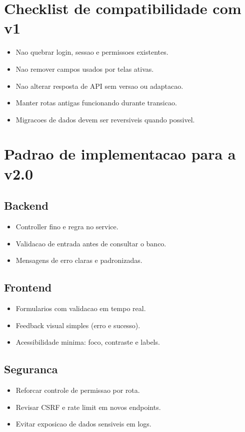 \documentclass[12pt,a4paper]{article}
\begin{document}
\section{Checklist de compatibilidade com v1}
\begin{itemize}[leftmargin=*]
\item Nao quebrar login, sessao e permissoes existentes.
\item Nao remover campos usados por telas ativas.
\item Nao alterar resposta de API sem versao ou adaptacao.
\item Manter rotas antigas funcionando durante transicao.
\item Migracoes de dados devem ser reversiveis quando possivel.
\end{itemize}

\section{Padrao de implementacao para a v2.0}
\subsection{Backend}
\begin{itemize}[leftmargin=*]
\item Controller fino e regra no service.
\item Validacao de entrada antes de consultar o banco.
\item Mensagens de erro claras e padronizadas.
\end{itemize}

\subsection{Frontend}
\begin{itemize}[leftmargin=*]
\item Formularios com validacao em tempo real.
\item Feedback visual simples (erro e sucesso).
\item Acessibilidade minima: foco, contraste e labels.
\end{itemize}

\subsection{Seguranca}
\begin{itemize}[leftmargin=*]
\item Reforcar controle de permissao por rota.
\item Revisar CSRF e rate limit em novos endpoints.
\item Evitar exposicao de dados sensiveis em logs.
\end{itemize}
\end{document}
